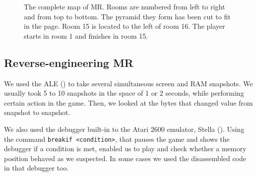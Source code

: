 \begin{figure}[p]
\begin{center}
\noindent{}
\end{center}
\caption[The complete map of \acl{MR}.]{The complete map of \acl{MR}. Rooms are
numbered from left to right and from top to bottom. The pyramid they form has
been cut to fit in the page. Room 15 is located to the left of room 16. The player
starts in room 1 and finishes in room 15.\label{fig:montezuma_all}}
\end{figure}

\subsection{Reverse-engineering \acl{MR}}
We used the \acl{ALE} (\cite{bellemare2013arcade}) to take several simultaneous
screen and \ac{RAM} snapshots. We usually took 5 to 10 snapshots in the space of
1 or 2 seconds, while performing certain action in the game. Then, we looked at
the bytes that changed value from snapshot to snapshot.

We also used the debugger built-in to the Atari 2600 emulator, Stella
(\cite{stella}). Using the command \verb-breakif <condition>-, that pauses the
game and shows the debugger if a condition is met, enabled us to play and check
whether a memory position behaved as we suspected. In some cases we used the
disassembled code in that debugger too.

